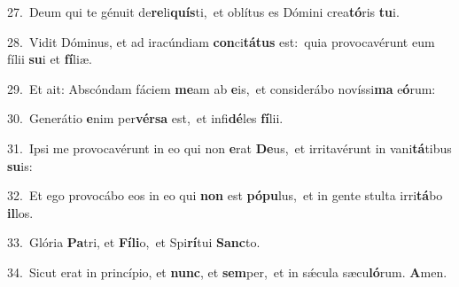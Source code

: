 {\numbfont\textcolor{\numbcolor}{27.}}~Deum qui te génuit de\-\textbf{re}\-li\-\textbf{quís}\-ti,~\star et oblítus es Dómini crea\-\textbf{tó}\-ris \textbf{tu}\-i.\par
{\numbfont\textcolor{\numbcolor}{28.}}~Vidit Dóminus, et ad iracúndiam \textbf{con}\-ci\-\textbf{tá}\-\textbf{tus} est:~\star quia provocavérunt eum fílii \textbf{su}\-i et \textbf{fí}\-liæ.\par
{\numbfont\textcolor{\numbcolor}{29.}}~Et ait: Abscóndam fáciem \textbf{me}\-am ab \textbf{e}\-is,~\star et considerábo novíssi\textbf{ma} e\-\textbf{ó}\-rum:\par
{\numbfont\textcolor{\numbcolor}{30.}}~Generátio \textbf{e}\-nim per\-\textbf{vér}\-\textbf{sa} est,~\star et infi\-\textbf{dé}\-les \textbf{fí}\-lii.\par
{\numbfont\textcolor{\numbcolor}{31.}}~Ipsi me provocavérunt in eo qui non \textbf{e}\-rat \textbf{De}\-us,~\star et irritavérunt in vani\-\textbf{tá}\-tibus \textbf{su}\-is:\par
{\numbfont\textcolor{\numbcolor}{32.}}~Et ego provocábo eos in eo qui \textbf{non} est \textbf{pó}\-\textbf{pu}lus,~\star et in gente stulta irri\-\textbf{tá}\-bo \textbf{il}\-los.\par
{\numbfont\textcolor{\numbcolor}{33.}}~Glória \textbf{Pa}\-tri, et \textbf{Fí}\-\textbf{li}o,~\star et Spi\-\textbf{rí}\-tui \textbf{Sanc}\-to.\par
{\numbfont\textcolor{\numbcolor}{34.}}~Sicut erat in princípio, et \textbf{nunc}\-, et \textbf{sem}\-per,~\star et in sǽcula sæcu\-\textbf{ló}\-rum. \textbf{A}\-men.\par
